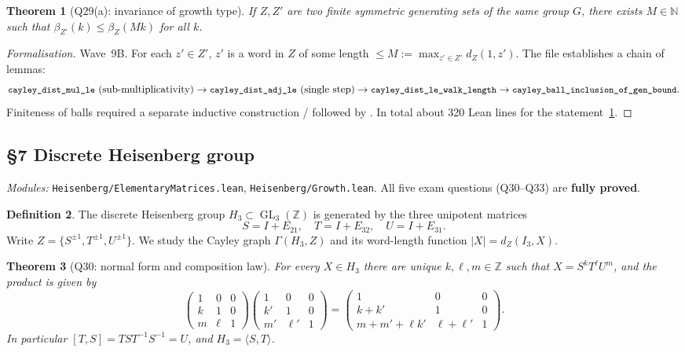 \documentclass[11pt,a4paper]{article}
\newcommand{\done}[1]{\textcolor{donegreen}{\textbf{#1}}}
\newcommand{\lmod}[1]{\texttt{\small #1}}
\newcommand{\N}{\mathbb{N}}
\newcommand{\Z}{\mathbb{Z}}
\theoremstyle{plain}
\newtheorem{theorem}{Theorem}[section]
\theoremstyle{definition}
\newtheorem{definition}[theorem]{Definition}
\begin{document}
\begin{theorem}[Q29(a): invariance of growth type]\label{thm:Q29a}
If $Z, Z'$ are two finite symmetric generating sets of the same group
$G$, there exists $M \in \N$ such that
$\beta_{Z'}(k) \leq \beta_Z(M k)$ for all $k$.
\end{theorem}

\begin{proof}[Formalisation]
Wave~9B. For each $z' \in Z'$, $z'$ is a word in $Z$ of some length
$\leq M := \max_{z' \in Z'} d_Z(1, z')$. The file establishes a chain of
lemmas:
\[\text{\lean{cayley\_dist\_mul\_le}} \ (\text{sub-multiplicativity}) \to
  \text{\lean{cayley\_dist\_adj\_le}} \ (\text{single step})
  \to \text{\lean{cayley\_dist\_le\_walk\_length}} \to
  \text{\lean{cayley\_ball\_inclusion\_of\_gen\_bound}}.
\]
Finiteness of balls required a separate inductive construction
/ followed by .
In total about 320 Lean lines for the statement~\ref{thm:Q29a}.
\end{proof}

\subsection{\S7 Discrete Heisenberg group}\label{sec:heis}
\emph{Modules:} \lmod{Heisenberg/ElementaryMatrices.lean},
\lmod{Heisenberg/Growth.lean}. All five exam questions
(Q30--Q33) are \done{fully proved}.

\begin{definition}
The discrete Heisenberg group $H_3 \subset \operatorname{GL}_3(\Z)$ is
generated by the three unipotent matrices
\[ S = I + E_{21},\quad T = I + E_{32},\quad U = I + E_{31}. \]
Write $Z = \{S^{\pm 1}, T^{\pm 1}, U^{\pm 1}\}$. We study the Cayley
graph $\Gamma(H_3, Z)$ and its word-length function
$|X| = d_Z(I_3, X)$.
\end{definition}

\begin{theorem}[Q30: normal form and composition law]
For every $X \in H_3$ there are unique $k, \ell, m \in \Z$ such that
$X = S^k T^\ell U^m$, and the product is given by
\[
\begin{pmatrix} 1 & 0 & 0 \\ k & 1 & 0 \\ m & \ell & 1 \end{pmatrix}
\begin{pmatrix} 1 & 0 & 0 \\ k' & 1 & 0 \\ m' & \ell' & 1 \end{pmatrix}
=
\begin{pmatrix} 1 & 0 & 0 \\ k+k' & 1 & 0 \\ m + m' + \ell k' & \ell+\ell' & 1 \end{pmatrix}.
\]
In particular $[T, S] = T S T^{-1} S^{-1} = U$, and $H_3 = \langle S, T\rangle$.
\end{theorem}
\end{document}
